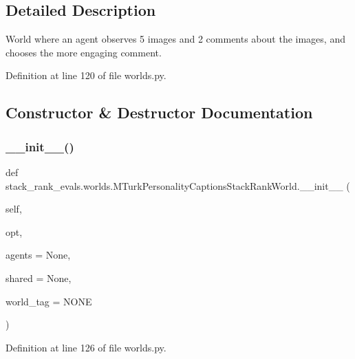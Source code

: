 \subsection{Detailed Description}
\begin{DoxyVerb}World where an agent observes 5 images and 2 comments about the images, and chooses
the more engaging comment.
\end{DoxyVerb}
 

Definition at line 120 of file worlds.\+py.



\subsection{Constructor \& Destructor Documentation}
\mbox{\label{classstack__rank__evals_1_1worlds_1_1MTurkPersonalityCaptionsStackRankWorld_ac193f25378717137c8681550c972be8a}} 
\subsubsection{\texorpdfstring{\+\_\+\+\_\+init\+\_\+\+\_\+()}{\_\_init\_\_()}}
{\footnotesize\ttfamily def stack\+\_\+rank\+\_\+evals.\+worlds.\+M\+Turk\+Personality\+Captions\+Stack\+Rank\+World.\+\_\+\+\_\+init\+\_\+\+\_\+ (\begin{DoxyParamCaption}\item[{}]{self,  }\item[{}]{opt,  }\item[{}]{agents = {\ttfamily None},  }\item[{}]{shared = {\ttfamily None},  }\item[{}]{world\+\_\+tag = {\ttfamily \textquotesingle{}NONE\textquotesingle{}} }\end{DoxyParamCaption})}



Definition at line 126 of file worlds.\+py.


